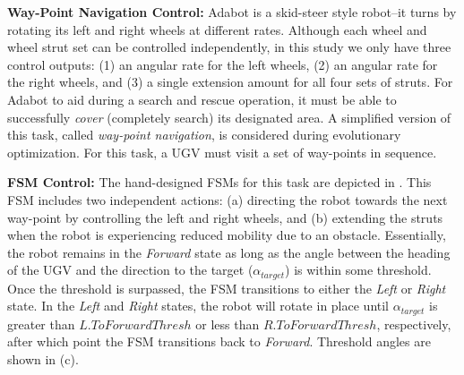\vspace{0.1in}
\noindent
\textbf{Way-Point Navigation Control:}
%
Adabot is a skid-steer style robot--it turns by rotating its left and right wheels at different rates. Although each wheel and wheel strut set can be controlled independently, in this study we only have three control outputs: (1) an angular rate for the left wheels, (2) an angular rate for the right wheels, and (3) a single extension amount for all four sets of struts.
%
For Adabot to aid during a search and rescue operation, it must be able to successfully \emph{cover} (completely search) its designated area.
%
A simplified version of this task, called \emph{way-point navigation}, is considered during evolutionary optimization.
%
For this task, a UGV must visit a set of way-points in sequence.
%


\vspace{0.1in}
\noindent
\textbf{FSM Control:}
The hand-designed FSMs for this task are depicted in .
%
This FSM includes two independent actions: (a) directing the robot towards the next way-point by controlling the left and right wheels, and (b) extending the struts when the robot is experiencing reduced mobility due to an obstacle.
%
Essentially, the robot remains in the \emph{Forward} state as long as the angle between the heading of the UGV and the direction to the target ($\alpha_{\mathit{target}}$) is within some threshold.
%
Once the threshold is surpassed, the FSM transitions to either the \emph{Left} or \emph{Right} state.
%
In the \emph{Left} and \emph{Right} states, the robot will rotate in place until $\alpha_{\mathit{target}}$ is greater than $L.ToForwardThresh$ or less than $R.ToForwardThresh$, respectively, after which point the FSM transitions back to \emph{Forward}.
%
Threshold angles are shown in (c).


